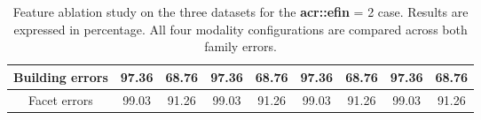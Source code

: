 \begin{table}[htbp]
\begin{tabular}{|c | c c | c c | c c | c c |}
                \hline
                Building errors & 97.36 & 68.76 & 97.36 & 68.76 & 97.36 & 68.76 & 97.36 & 68.76 \\
                \hline
                Facet errors & 99.03 & 91.26 & 99.03 & 91.26 & 99.03 & 91.26 & 99.03 & 91.26 \\
                \hline
            \end{tabular}
            \caption{
                \label{tab::ablation_f2}
                Feature ablation study on the three datasets for the \textbf{\gls{acr::efin}} = 2 case.
                Results are expressed in percentage.
                All four modality configurations are compared across both family errors.
            }
        \end{table}
    
        \begin{figure}[htbp]
        \end{figure}
    

